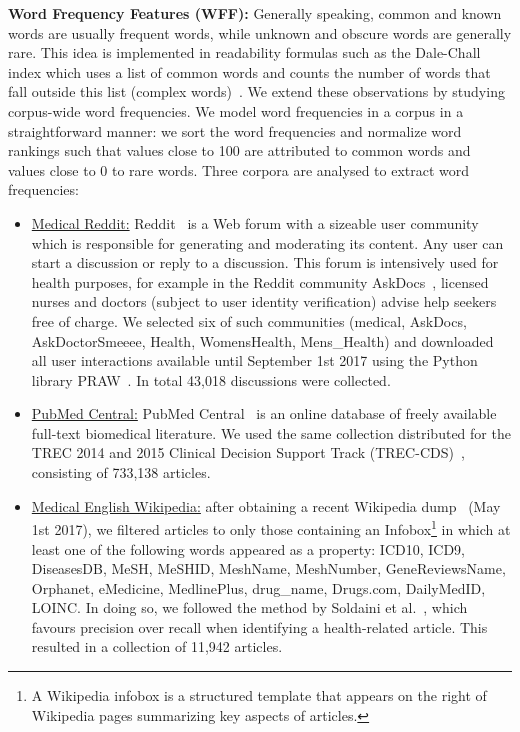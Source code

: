 \textbf{Word Frequency Features (WFF):}
Generally speaking, common and known words are usually frequent words, while unknown and obscure words are generally rare. This idea is implemented in readability formulas such as the Dale-Chall index which uses a list of common words and counts the number of words that fall outside this list (complex words)~\cite{dale48}.
We extend these observations by studying corpus-wide word frequencies. 
We model word frequencies in a corpus in a straightforward manner: we sort the word frequencies and normalize word rankings such that values close to 100 are attributed to common words and values close to 0 to rare words. Three corpora are analysed to extract word frequencies:

\begin{itemize}
\item \underline{Medical Reddit:} Reddit~\cite{reddit} is a Web forum with a sizeable user community which is responsible for generating and moderating its content. Any user can start a discussion or reply to a discussion. This forum is intensively used for health purposes, for example in the Reddit community AskDocs~\cite{redditaskdocs}, licensed nurses and doctors (subject to user identity verification) advise help seekers free of charge. We selected six of such communities
    (medical, AskDocs, AskDoctorSmeeee, Health, WomensHealth, Mens\_Health) and downloaded all user interactions available until September 1st 2017 using the Python library PRAW~\cite{redditapi}. In total 43,018 discussions were collected.

\item \underline{PubMed Central:} PubMed Central~\cite{pubmed} is an online  database of freely available full-text biomedical literature. We used the same collection distributed for the TREC 2014 and 2015 Clinical Decision Support Track (TREC-CDS)~\cite{roberts16,trec15}, consisting of 733,138 articles. 
 
\item \underline{Medical English Wikipedia:} after obtaining a recent  Wikipedia dump~\cite{wikipedia} (May 1st 2017), we filtered articles to only those  containing an Infobox\footnote{A Wikipedia infobox is a structured template that appears on the right of Wikipedia pages summarizing key aspects of articles.} in which at least one of the following words appeared as a property: ICD10, ICD9, DiseasesDB, MeSH, MeSHID, MeshName, MeshNumber, GeneReviewsName, Orphanet, eMedicine, MedlinePlus, drug\_name, Drugs.com, DailyMedID, LOINC.
In doing so, we followed the method by Soldaini et al.~\cite{soldaini15}, which favours precision over recall when identifying a health-related article. This resulted in a collection of 11,942 articles. 
\end{itemize}

